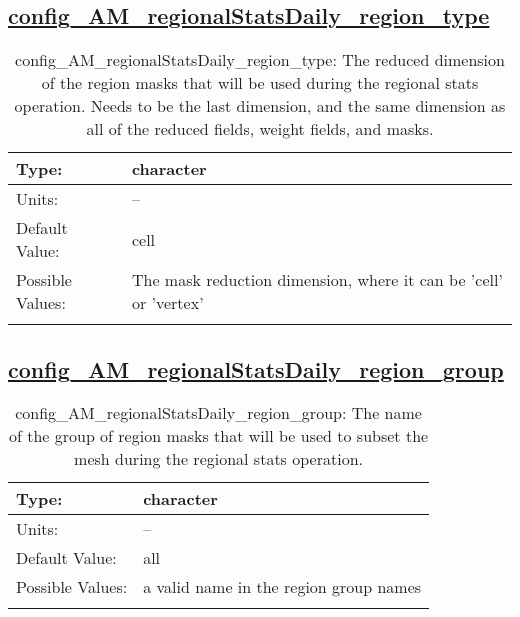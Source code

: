 \subsection[config\_AM\_regionalStatsDaily\_region\_type]{\hyperref[sec:nm_tab_AM_regionalStatsDaily]{config\_AM\_regionalStatsDaily\_region\_type}}
\label{subsec:nm_sec_config_AM_regionalStatsDaily_region_type}
\begin{center}
\begin{longtable}{| p{2.0in} || p{4.0in} |}
    \hline
    Type: & character \\
    \hline
    Units: & -- \\
    \hline
    Default Value: & cell \\
    \hline
    Possible Values: & The mask reduction dimension, where it can be 'cell' or 'vertex' \\
    \hline
    \caption{config\_AM\_regionalStatsDaily\_region\_type: The reduced dimension of the region masks that will be used during the regional stats operation. Needs to be the last dimension, and the same dimension as all of the reduced fields, weight fields, and masks.}
\end{longtable}
\end{center}
\subsection[config\_AM\_regionalStatsDaily\_region\_group]{\hyperref[sec:nm_tab_AM_regionalStatsDaily]{config\_AM\_regionalStatsDaily\_region\_group}}
\label{subsec:nm_sec_config_AM_regionalStatsDaily_region_group}
\begin{center}
\begin{longtable}{| p{2.0in} || p{4.0in} |}
    \hline
    Type: & character \\
    \hline
    Units: & -- \\
    \hline
    Default Value: & all \\
    \hline
    Possible Values: & a valid name in the region group names \\
    \hline
    \caption{config\_AM\_regionalStatsDaily\_region\_group: The name of the group of region masks that will be used to subset the mesh during the regional stats operation.}
\end{longtable}
\end{center}
